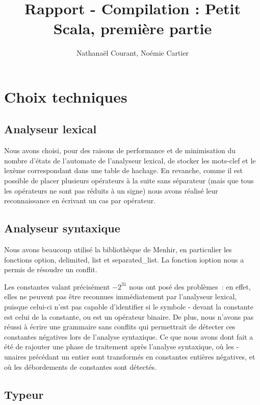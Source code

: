 \documentclass[a4paper,10pt]{article}
\title{Rapport - Compilation : Petit Scala, première partie}
\author{Nathanaël Courant, Noémie Cartier}
\newcommand{\code}[1]{{\fontfamily{pcr}\selectfont #1}}
\begin{document}
\maketitle

\section{Choix techniques}

\subsection{Analyseur lexical}

Nous avons choisi, pour des raisons de performance et de minimisation
du nombre d'états de l'automate de l'analyseur lexical, de stocker les
mots-clef et le lexème correspondant dans une table de hachage. En
revanche, comme il est possible de placer plusieurs opérateurs à la
suite sans séparateur (mais que tous les opérateurs ne sont pas
réduits à un signe) nous avons réalisé leur reconnaissance en écrivant
un cas par opérateur.

\subsection{Analyseur syntaxique}


Nous avons beaucoup utilisé la bibliothèque de Menhir, 
en particulier les fonctions 
\code{option}, \code{delimited}, \code{list} et \code{separated\_{}list}. 
La fonction \code{ioption} nous a permis de résoudre un conflit.

Les constantes valant précisément $-2^{31}$ nous ont posé des
problèmes~: en effet, elles ne peuvent pas être reconnues
immédiatement par l'analyseur lexical, puisque celui-ci n'est pas
capable d'identifier si le symbole \code{-} devant la constante est
celui de la constante, ou est un opérateur binaire. De plus, nous
n'avons pas réussi à écrire une grammaire sans conflits
qui permettrait de détecter ces constantes négatives lors de l'analyse
syntaxique. Ce que nous avons dont fait a été de rajouter une phase de
traitement après l'analyse syntaxique, où les \code{-} unaires
précédant un entier sont transformés en constantes entières négatives,
et où les débordements de constantes sont détectés.

\subsection{Typeur}
\end{document}
